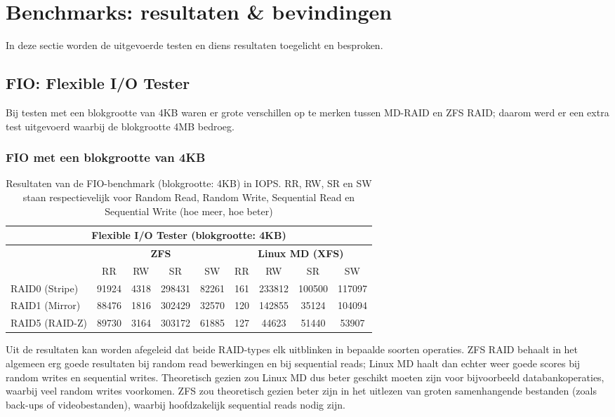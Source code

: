 \section{Benchmarks: resultaten \& bevindingen}

In deze sectie worden de uitgevoerde testen en diens resultaten toegelicht en besproken.

\subsection{FIO: Flexible I/O Tester}

Bij testen met een blokgrootte van 4KB waren er grote verschillen op te merken tussen MD-RAID en ZFS RAID; daarom werd er een extra test uitgevoerd waarbij de blokgrootte 4MB bedroeg. 

\subsubsection{FIO met een blokgrootte van 4KB}

\begin{table}[h]
  \centering
  \begin{tabular}{l || c c c c | c c c c}
    \hline
    \multicolumn{9}{c}{\textbf{Flexible I/O Tester (blokgrootte: 4KB)}} \\
    \hline
    & \multicolumn{4}{c|}{\textbf{ZFS}} & \multicolumn{4}{|c}{\textbf{Linux MD (XFS)}} \\
    & RR & RW & SR & SW & RR & RW & SR & SW \\
    \hline
    RAID0 (Stripe) & 91924 & 4318 & 298431 & 82261 & 161 & 233812 & 100500  & 117097  \\
    RAID1 (Mirror) & 88476 & 1816 & 302429 & 32570 & 120 & 142855 & 35124  & 104094 \\
    RAID5 (RAID-Z) & 89730 & 3164 & 303172 & 61885 & 127 & 44623 & 51440  & 53907 \\
  \end{tabular}
  \caption{Resultaten van de FIO-benchmark (blokgrootte: 4KB) in IOPS. RR, RW, SR en SW staan respectievelijk voor Random Read, Random Write, Sequential Read en Sequential Write (hoe meer, hoe beter)}
  \label{tab:results_fio_4k}
\end{table}

Uit de resultaten kan worden afegeleid dat beide RAID-types elk uitblinken in bepaalde soorten operaties. ZFS RAID behaalt in het algemeen erg goede resultaten bij random read bewerkingen en bij sequential reads; Linux MD haalt dan echter weer goede scores bij random writes en sequential writes. Theoretisch gezien zou Linux MD dus beter geschikt moeten zijn voor bijvoorbeeld databankoperaties, waarbij veel random writes voorkomen. ZFS zou theoretisch gezien beter zijn in het uitlezen van groten samenhangende bestanden (zoals back-ups of videobestanden), waarbij hoofdzakelijk sequential reads nodig zijn.  

